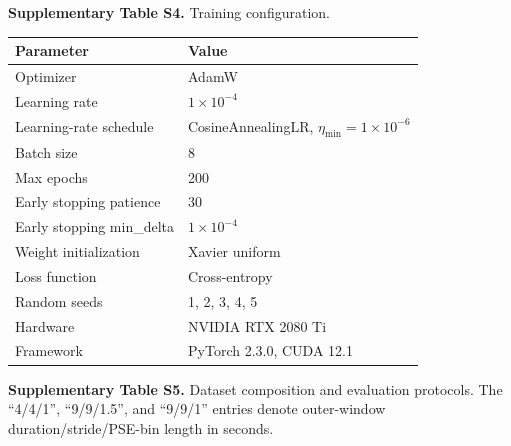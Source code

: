 \documentclass[12pt,technote,onecolumn]{IEEEtran}
\newcommand{\ResponseTableFormat}{%
  \footnotesize
  \renewcommand{\arraystretch}{1.2}%
  \setlength{\tabcolsep}{4pt}%
}
\begin{document}
\noindent\begin{minipage}{\linewidth}
\smallskip\noindent\textbf{Supplementary Table S4.} Training configuration.
\begin{center}
\ResponseTableFormat
\begin{tabular*}{\linewidth}{@{\extracolsep{\fill}}ll@{}}
\toprule
Parameter & Value \\
\midrule
Optimizer & AdamW \\
Learning rate & $1 \times 10^{-4}$ \\
Learning-rate schedule & CosineAnnealingLR, $\eta_{\min} = 1 \times 10^{-6}$ \\
Batch size & 8 \\
Max epochs & 200 \\
Early stopping patience & 30 \\
Early stopping min\_delta & $1 \times 10^{-4}$ \\
Weight initialization & Xavier uniform \\
Loss function & Cross-entropy \\
Random seeds & 1, 2, 3, 4, 5 \\
Hardware & NVIDIA RTX 2080 Ti \\
Framework & PyTorch 2.3.0, CUDA 12.1 \\
\bottomrule
\end{tabular*}
\end{center}
\end{minipage}\par\medskip

\smallskip\noindent\textbf{Supplementary Table S5.} Dataset composition and evaluation protocols. The ``4/4/1'', ``9/9/1.5'', and ``9/9/1'' entries denote outer-window duration/stride/PSE-bin length in seconds.
\begin{center}
\ResponseTableFormat
{}
\end{center}
\end{document}
